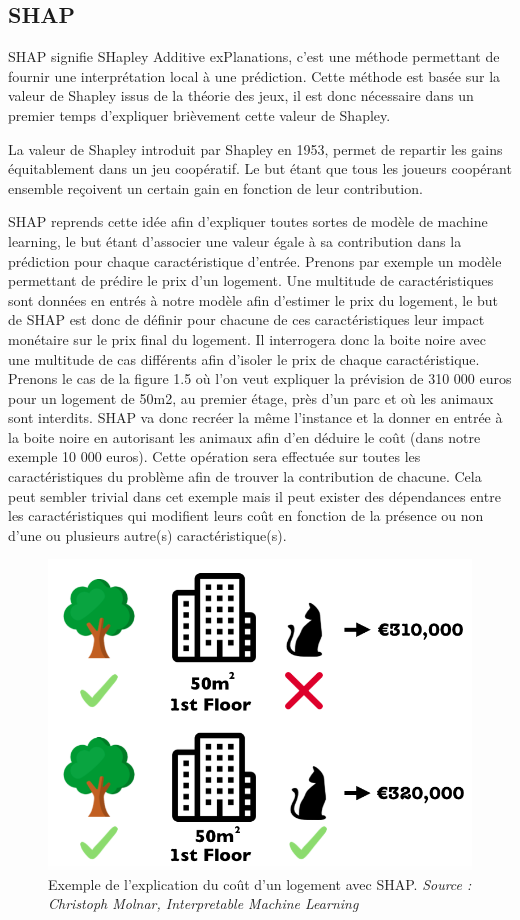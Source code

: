 \subsection{SHAP}
SHAP signifie SHapley Additive exPlanations, c'est une méthode permettant de fournir une interprétation local à une prédiction. Cette méthode est basée sur la valeur de Shapley issus de la théorie des jeux, il est donc nécessaire dans un premier temps d'expliquer brièvement cette valeur de Shapley.\par
La valeur de Shapley introduit par Shapley en 1953, permet de repartir les gains équitablement dans un jeu coopératif. Le but étant que tous les joueurs coopérant ensemble reçoivent un certain gain en fonction de leur contribution.\par
SHAP reprends cette idée afin d'expliquer toutes sortes de modèle de machine learning, le but étant d'associer une valeur égale à sa contribution dans la prédiction pour chaque caractéristique d'entrée. Prenons par exemple un modèle permettant de prédire le prix d'un logement. Une multitude de caractéristiques sont données en entrés à notre modèle afin d'estimer le prix du logement, le but de SHAP est donc de définir pour chacune de ces caractéristiques leur impact monétaire sur le prix final du logement. Il interrogera donc la boite noire avec une multitude de cas différents afin d'isoler le prix de chaque caractéristique. Prenons le cas de la figure 1.5 où l'on veut expliquer la prévision de 310 000 euros pour un logement de 50m2, au premier étage, près d'un parc et où les animaux sont interdits. SHAP va donc recréer la même l'instance et la donner en entrée à la boite noire en autorisant les animaux afin d'en déduire le coût (dans notre exemple 10 000 euros). Cette opération sera effectuée sur toutes les caractéristiques du problème afin de trouver la contribution de chacune. Cela peut sembler trivial dans cet exemple mais il peut exister des dépendances entre les caractéristiques qui modifient leurs coût en fonction de la présence ou non d'une ou plusieurs autre(s) caractéristique(s).
\begin{figure}[h]
\centering
\includegraphics[scale=0.3]{src_img/shapleyExemple.png}
\caption{Exemple de l'explication du coût d'un logement avec SHAP. \textit{Source : Christoph Molnar, Interpretable Machine Learning}}
\label{shapleyExemple}
\end{figure}

